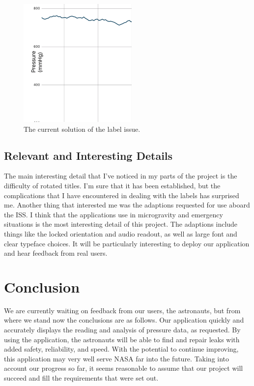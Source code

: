 \documentclass[onecolumn, draftclsnofoot,10pt, compsoc]{IEEEtran}
\begin{document}
\begin{figure}[H]
  \centering
  \includegraphics[width=.3\linewidth]{solution}
  \caption{The current solution of the label issue.}
  \label{fig:solution}
\end{figure}

\subsection{Relevant and Interesting Details}

The main interesting detail that I've noticed in my parts of the project is the difficulty of rotated titles.
I'm sure that it has been established, but the complications that I have encountered in dealing with the labels has surprised me.
Another thing that interested me was the adaptions requested for use aboard the ISS.
I think that the applications use in microgravity and emergency situations is the most interesting detail of this project.
The adaptions include things like the locked orientation and audio readout, as well as large font and clear typeface choices.
It will be particularly interesting to deploy our application and hear feedback from real users.

\section{Conclusion}

We are currently waiting on feedback from our users, the astronauts, but from where we stand now the conclusions are as follows.
Our application quickly and accurately displays the reading and analysis of pressure data, as requested.
By using the application, the astronauts will be able to find and repair leaks with added safety, reliability, and speed.
With the potential to continue improving, this application may very well serve NASA far into the future.
Taking into account our progress so far, it seems reasonable to assume that our project will succeed and fill the requirements that were set out.
​

\newpage


\end{document}
